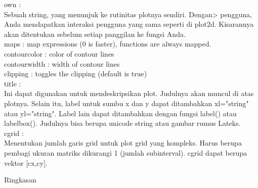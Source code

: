 \documentclass[a4paper,10pt]{article}
\begin{document}
\begin{eulernotebook}
\begin{eulercomment}
\begin{eulercomment}
\begin{eulercomment}
\begin{eulercomment}
\begin{eulercomment}
\begin{eulercomment}
\begin{eulercomment}
\begin{eulercomment}
\begin{eulercomment}
\begin{eulercomment}
\begin{eulercomment}
\begin{eulercomment}
\begin{eulercomment}
\begin{eulercomment}
\begin{eulercomment}
\begin{eulercomment}
\begin{eulercomment}
\begin{eulercomment}
\begin{eulercomment}
\begin{eulercomment}
\begin{eulercomment}
\begin{eulercomment}
\begin{eulercomment}
\begin{eulercomment}
\begin{eulercomment}
\begin{eulercomment}
\begin{eulercomment}
\begin{eulercomment}
\begin{eulercomment}
\begin{eulercomment}
\begin{eulercomment}
\begin{eulercomment}
\begin{eulercomment}
\begin{eulercomment}
\begin{eulercomment}
\begin{eulercomment}
\begin{eulercomment}
\begin{eulercomment}
\begin{eulercomment}
own       :\\
Sebuah string, yang menunjuk ke rutinitas plotnya sendiri. Dengan\textgreater{}
pengguna, Anda mendapatkan interaksi pengguna yang sama seperti di
plot2d. Kisarannya akan ditentukan sebelum setiap panggilan ke fungsi
Anda.\\
maps      : map expressions (0 is faster), functions are always
mapped.\\
contourcolor : color of contour lines\\
contourwidth : width of contour lines\\
clipping     : toggles the clipping (default is true)\\
title        :\\
Ini dapat digunakan untuk mendeskripsikan plot. Judulnya akan muncul
di atas plotnya. Selain itu, label untuk sumbu x dan y dapat
ditambahkan xl="string" atau yl="string". Label lain dapat ditambahkan
dengan fungsi label() atau labelbox(). Judulnya bisa berupa unicode
string atau gambar rumus Lateks.\\
cgrid     :\\
Menentukan jumlah garis grid untuk plot grid yang kompleks. Harus
berupa pembagi ukuran matriks dikurangi 1 (jumlah subinterval). cgrid
dapat berupa vektor [cx,cy].

Ringkasan


\end{eulercomment}
\end{eulercomment}
\end{eulercomment}
\end{eulercomment}
\end{eulercomment}
\end{eulercomment}
\end{eulercomment}
\end{eulercomment}
\end{eulercomment}
\end{eulercomment}
\end{eulercomment}
\end{eulercomment}
\end{eulercomment}
\end{eulercomment}
\end{eulercomment}
\end{eulercomment}
\end{eulercomment}
\end{eulercomment}
\end{eulercomment}
\end{eulercomment}
\end{eulercomment}
\end{eulercomment}
\end{eulercomment}
\end{eulercomment}
\end{eulercomment}
\end{eulercomment}
\end{eulercomment}
\end{eulercomment}
\end{eulercomment}
\end{eulercomment}
\end{eulercomment}
\end{eulercomment}
\end{eulercomment}
\end{eulercomment}
\end{eulercomment}
\end{eulercomment}
\end{eulercomment}
\end{eulercomment}
\end{eulercomment}
\end{eulernotebook}
\end{document}
